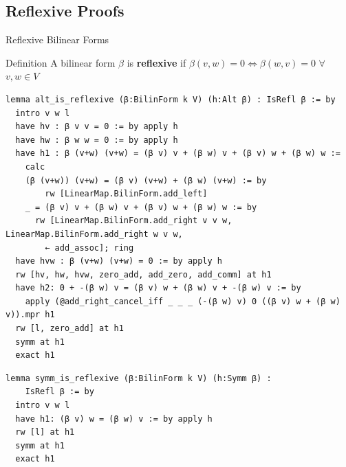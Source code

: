 \documentclass[svgnames]{beamer}
\begin{document}
\subsection{Reflexive Proofs}
\begin{frame}{Reflexive Bilinear Forms}
\begin{block}{Definition}
A bilinear form $\beta$ is \textbf{reflexive} if
$\beta(v,w)=0\iff\beta(w,v)=0$ $\forall$ $v,w\in V$
\end{block}
\end{frame}

{\tiny
\begin{verbatim}
lemma alt_is_reflexive (β:BilinForm k V) (h:Alt β) : IsRefl β := by
  intro v w l
  have hv : β v v = 0 := by apply h
  have hw : β w w = 0 := by apply h
  have h1 : β (v+w) (v+w) = (β v) v + (β w) v + (β v) w + (β w) w :=
    calc
    (β (v+w)) (v+w) = (β v) (v+w) + (β w) (v+w) := by 
        rw [LinearMap.BilinForm.add_left]
    _ = (β v) v + (β w) v + (β v) w + (β w) w := by
      rw [LinearMap.BilinForm.add_right v v w, LinearMap.BilinForm.add_right w v w, 
        ← add_assoc]; ring
  have hvw : β (v+w) (v+w) = 0 := by apply h
  rw [hv, hw, hvw, zero_add, add_zero, add_comm] at h1
  have h2: 0 + -(β w) v = (β v) w + (β w) v + -(β w) v := by
    apply (@add_right_cancel_iff _ _ _ (-(β w) v) 0 ((β v) w + (β w) v)).mpr h1
  rw [l, zero_add] at h1
  symm at h1
  exact h1
\end{verbatim}
}

{\tiny
\begin{verbatim}
lemma symm_is_reflexive (β:BilinForm k V) (h:Symm β) : 
    IsRefl β := by
  intro v w l
  have h1: (β v) w = (β w) v := by apply h
  rw [l] at h1
  symm at h1
  exact h1
\end{verbatim}
}
\end{document}
